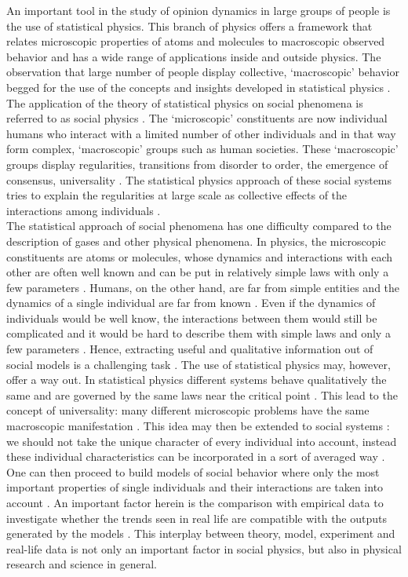\documentclass[11 pt , letterpaper , twoside , openright]{book}
\begin{document}
An important tool in the study of opinion dynamics in large groups of people is the use of statistical physics. This branch of physics offers a framework that relates microscopic properties of atoms and molecules to macroscopic observed behavior and has a wide range of applications inside and outside physics. The observation that large number of people display collective, `macroscopic' behavior begged for the use of the concepts and insights developed in statistical physics \cite{Sirbu2016}. The application of the theory of statistical physics on social phenomena is referred to as social physics \cite{Castellano2009}\cite{Galam2008}\cite{Galam1982}\cite{Stauffer2012}. The `microscopic' constituents are now individual humans who interact with a limited number of other individuals and in that way form complex, `macroscopic' groups such as human societies. These `macroscopic' groups display regularities, transitions from disorder to order, the emergence of consensus, universality \cite{Buchanan2007}. The statistical physics approach of these social systems tries to explain the regularities at large scale as collective effects of the interactions among individuals \cite{Sirbu2016}.\\
\newline
The statistical approach of social phenomena has one difficulty compared to the description of gases and other physical phenomena. In physics, the microscopic constituents are atoms or molecules, whose dynamics and interactions with each other are often well known and can be put in relatively simple laws with only a few parameters \cite{Castellano2009}. Humans, on the other hand, are far from simple entities and the dynamics of a single individual are far from known \cite{Castellano2009}. Even if the dynamics of individuals would be well know, the interactions between them would still be complicated and it would be hard to describe them with simple laws and only a few parameters \cite{Castellano2009}. Hence, extracting useful and qualitative information out of social models is a challenging task \cite{Castellano2009}. The use of statistical physics may, however, offer a way out. In statistical physics different systems behave qualitatively the same and are governed by the same laws near the critical point \cite{Hu2018}\cite{Kadanoff2010}. This lead to the concept of universality: many different microscopic problems have the same macroscopic manifestation \cite{Gug2015}\cite{Kadanoff2015}. This idea may then be extended to social systems \cite{Hu2018}: we should not take the unique character of every individual into account, instead these individual characteristics can be incorporated in a sort of averaged way \cite{Gug2015}. One can then proceed to build models of social behavior where only the most important properties of single individuals and their interactions are taken into account \cite{Castellano2009}. An important factor herein is the comparison with empirical data to investigate whether the trends seen in real life are compatible with the outputs generated by the models \cite{Castellano2009}\cite{Pawel}. This interplay between theory, model, experiment and real-life data is not only an important factor in social physics, but also in physical research and science in general.
\newpage
\noindent
\end{document}
